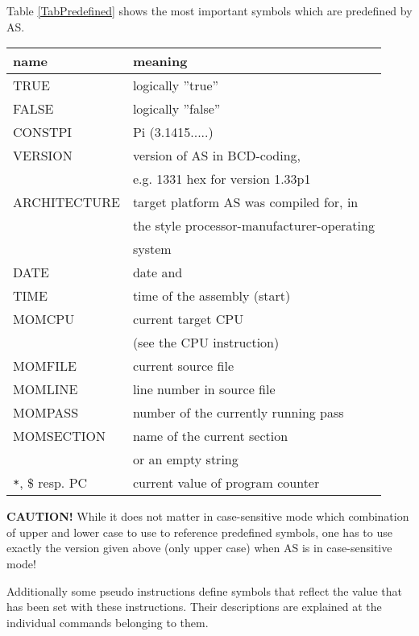 \documentclass[12pt,twoside]{report}
\newcommand{\bb}[1]{{\bf #1}}
\begin{document}
Table \ref{TabPredefined} shows the most important symbols which are
predefined by AS.
\begin{table*}[htb]
\begin{center}\begin{tabular}{|l|l|}
\hline
name          & meaning \\
\hline
\hline
TRUE          & logically ''true'' \\
FALSE         & logically ''false'' \\
CONSTPI       & Pi (3.1415.....) \\
VERSION       & version of AS in BCD-coding, \\
              & e.g. 1331 hex for version 1.33p1 \\
ARCHITECTURE  & target platform AS was compiled for, in \\
              & the style processor-manufacturer-operating \\
              & system \\
DATE          & date and \\
TIME          & time of the assembly (start) \\
MOMCPU        & current target CPU \\
              & (see the CPU instruction) \\
MOMFILE       & current source file \\
MOMLINE       & line number in source file \\
MOMPASS       & number of the currently running pass \\
MOMSECTION    & name of the current section \\
              & or an empty string \\
\verb!*!, \$ resp. PC & current value of program counter \\
\hline
\end{tabular}\end{center}
\caption{Predefined Symbols\label{TabPredefined}}
\end{table*}
\bb{CAUTION!}  While it does not matter in case-sensitive mode which
combination of upper and lower case to use to reference predefined
symbols, one has to use exactly the version given above (only upper
case) when AS is in case-sensitive mode!

Additionally some pseudo instructions define symbols that reflect the
value that has been set  with these instructions.  Their descriptions
are explained at the individual commands belonging to them.
\end{document}
